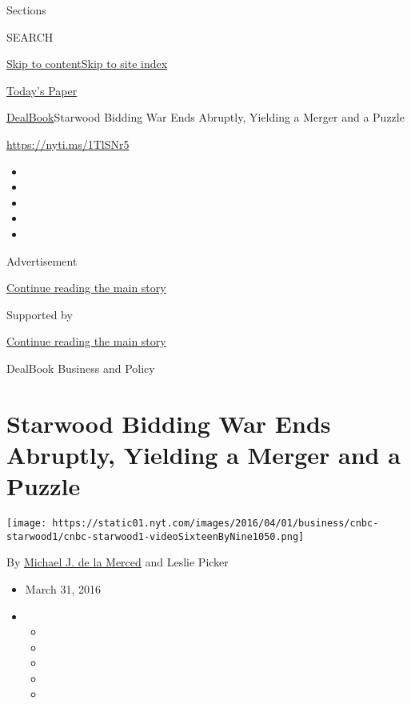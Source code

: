 Sections

SEARCH

\protect\hyperlink{site-content}{Skip to
content}\protect\hyperlink{site-index}{Skip to site index}

\href{https://myaccount.nytimes.com/auth/login?response_type=cookie\&client_id=vi}{}

\href{https://www.nytimes.com/section/todayspaper}{Today's Paper}

\href{/section/business/dealbook}{DealBook}\textbar{}Starwood Bidding
War Ends Abruptly, Yielding a Merger and a Puzzle

\url{https://nyti.ms/1TlSNr5}

\begin{itemize}
\item
\item
\item
\item
\item
\end{itemize}

Advertisement

\protect\hyperlink{after-top}{Continue reading the main story}

Supported by

\protect\hyperlink{after-sponsor}{Continue reading the main story}

DealBook Business and Policy

\hypertarget{starwood-bidding-war-ends-abruptly-yielding-a-merger-and-a-puzzle}{%
\section{Starwood Bidding War Ends Abruptly, Yielding a Merger and a
Puzzle}\label{starwood-bidding-war-ends-abruptly-yielding-a-merger-and-a-puzzle}}

\texttt{[image: https://static01.nyt.com/images/2016/04/01/business/cnbc-starwood1/cnbc-starwood1-videoSixteenByNine1050.png]}

By \href{http://www.nytimes.com/by/michael-j-de-la-merced}{Michael J. de
la Merced} and Leslie Picker

\begin{itemize}
\item
  March 31, 2016
\item
  \begin{itemize}
  \item
  \item
  \item
  \item
  \item
  \end{itemize}
\end{itemize}

